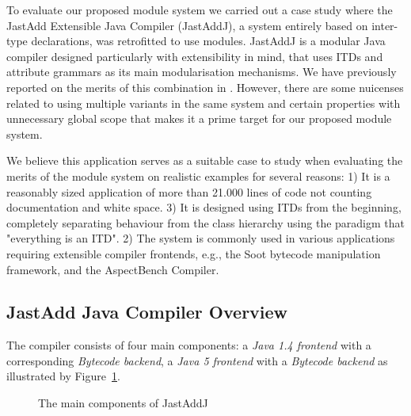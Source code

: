 To evaluate our proposed module system we carried out a case study where
the JastAdd Extensible Java Compiler (JastAddJ), a system entirely based on
inter-type declarations, was retrofitted to use modules. JastAddJ is a
modular Java compiler designed particularly with extensibility in mind,
that uses ITDs and attribute grammars as its main modularisation
mechanisms.  We have previously reported on the merits of this combination
in \cite{aosd08abc}. However, there are some nuicenses related to using
multiple variants in the same system and certain properties with
unnecessary global scope that makes it a prime target for our proposed
module system. 

We believe this application serves as a suitable case to study when
evaluating the merits of the module system on realistic examples for
several reasons: 1) It is a reasonably sized application of more than
21.000 lines of code not counting documentation and white space.  3) It is
designed using ITDs from the beginning, completely separating behaviour
from the class hierarchy using the paradigm that "everything is an ITD". 2)
The system is commonly used in various applications requiring extensible
compiler frontends, e.g., the Soot bytecode manipulation framework, and the
AspectBench Compiler.

\subsection{JastAdd Java Compiler Overview}
\label{jastaddjoverview}
The compiler consists of four main components: a \emph{Java 1.4 frontend}
with a corresponding \emph{Bytecode backend}, a \emph{Java 5 frontend} with
a \emph{Bytecode backend} as illustrated by Figure~\ref{MainComponents}. 

\begin{figure}[htb!]
  \begin{center}
    \caption{The main components of JastAddJ}
    \label{MainComponents}
  \end{center}
\end{figure}


